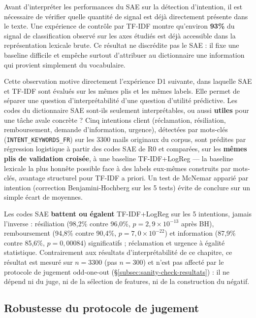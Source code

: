 \documentclass[11pt]{article}
\begin{document}
Avant d'interpréter les performances du SAE sur la détection d'intention, il est
nécessaire de vérifier quelle quantité de signal est déjà directement présente dans
le texte. Une expérience de contrôle par TF-IDF montre qu'environ \textbf{93\%} du
signal de classification observé sur les axes étudiés est déjà accessible dans la
représentation lexicale brute. Ce résultat ne discrédite pas le SAE : il fixe une
baseline difficile et empêche surtout d'attribuer au dictionnaire une information
qui provient simplement du vocabulaire.

Cette observation motive directement l'expérience D1 suivante, dans laquelle SAE et
TF-IDF sont évalués sur les mêmes plis et les mêmes labels. Elle permet de séparer une
question d'interprétabilité d'une question d'utilité prédictive. Les
codes du dictionnaire SAE sont-ils seulement interprétables, ou aussi
\textbf{utiles} pour une tâche avale concrète ? Cinq intentions client
(réclamation, résiliation, remboursement, demande d'information, urgence),
détectées par mots-clés (\texttt{INTENT\_KEYWORDS\_FR}) sur les 3300 mails
originaux du corpus, sont prédites par régression logistique à partir des
codes SAE de R0 et comparées, sur les \textbf{mêmes plis de validation
croisée}, à une baseline TF-IDF+LogReg --- la baseline lexicale la plus
honnête possible face à des labels eux-mêmes construits par mots-clés,
avantage structurel pour TF-IDF a priori. Un test de McNemar apparié par
intention (correction Benjamini-Hochberg sur les 5 tests) évite de conclure
sur un simple écart de moyennes.

\begin{resultbox}[D1 --- SAE contre TF-IDF+LogReg ($n{=}3300$)]
Les codes SAE \textbf{battent ou égalent} TF-IDF+LogReg sur les 5 intentions,
jamais l'inverse : résiliation (98,2\% contre 96,0\%, $p=2{,}9\times10^{-13}$
après BH), remboursement (94,8\% contre 90,4\%, $p=7{,}0\times10^{-22}$) et
information (87,9\% contre 85,6\%, $p=0{,}00084$) significatifs ;
réclamation et urgence à égalité statistique. Contrairement aux résultats
d'interprétabilité de ce chapitre, ce résultat est mesuré sur $n=3300$ (pas
$n=300$) et n'est pas affecté par le protocole de jugement odd-one-out
(\S\ref{subsec:sanity-check-resultats}) : il ne dépend ni du juge, ni de la
sélection de features, ni de la construction du négatif.
\end{resultbox}

\subsection{Robustesse du protocole de jugement}
\label{subsec:robustesse}
\end{document}
